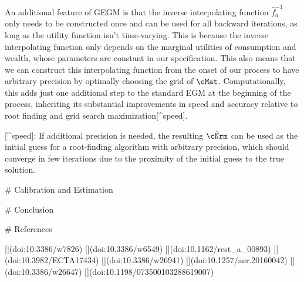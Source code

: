 An additional feature of GEGM is that the inverse interpolating function $\hat{f}_{a}^{-1}$ only needs to be constructed once and can be used for all backward iterations, as long as the utility function isn't time-varying. This is because the inverse interpolating function only depends on the marginal utilities of consumption and wealth, whose parameters are constant in our specification. This also means that we can construct this interpolating function from the onset of our process to have arbitrary precision by optimally choosing the grid of $\cMat$. Computationally, this adds just one additional step to the standard EGM at the beginning of the process, inheriting its substantial improvements in speed and accuracy relative to root finding and grid search maximization[^speed].

[^speed]: If additional precision is needed, the resulting $\hat{\cNrm}$ can be used as the initial guess for a root-finding algorithm with arbitrary precision, which should converge in few iterations due to the proximity of the initial guess to the true solution.

# Calibration and Estimation

# Conclusion

# References

    [](doi:10.3386/w7826)
[](doi:10.3386/w6549)
[](doi:10.1162/rest_a_00893)
[](doi:10.3982/ECTA17434)
[](doi:10.3386/w26941)
[](doi:10.1257/aer.20160042)
[](doi:10.3386/w26647)
[](doi:10.1198/073500103288619007)